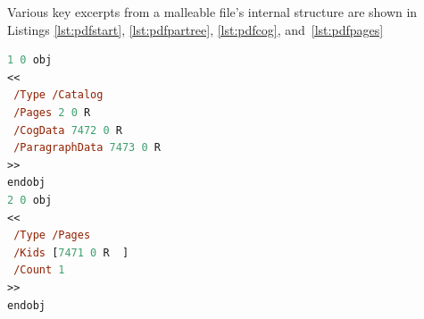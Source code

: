Various key excerpts from a malleable \pdf{} file's internal structure are shown in Listings \ref{lst:pdfstart}, \ref{lst:pdfpartree}, \ref{lst:pdfcog}, and~\ref{lst:pdfpages}

\begin{lstlisting}[label=lst:pdfstart,captionpos=b,language=postscript,float,basicstyle=\ttfamily\footnotesize,caption={[Excerpt from a malleable document \textsc{pdf}]An excerpt from the start of a malleable document \pdf{} file. A reference to the \texttt{/ParagraphData} object (shown in Listing~\ref{lst:pdfpartree}) has been added to the \pdf{}'s \texttt{/Catalog} object. The \texttt{/Pages} object is also shown\ed{}note that there is only ever one page in a malleable \pdf{}.}]
%PDF-1.4
1 0 obj
<<
 /Type /Catalog
 /Pages 2 0 R
 /CogData 7472 0 R
 /ParagraphData 7473 0 R
>>
endobj
2 0 obj
<<
 /Type /Pages
 /Kids [7471 0 R  ]
 /Count 1
>>
endobj
\end{lstlisting}


